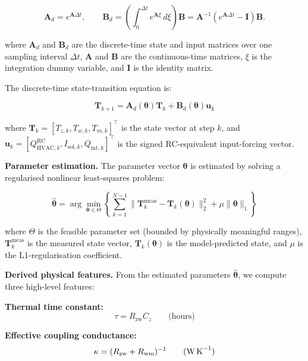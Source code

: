\documentclass[11pt]{article}
\begin{document}
\begin{equation}
\mathbf{A}_d=e^{\mathbf{A}\Delta t},
\qquad
\mathbf{B}_d=
\left(
\int_0^{\Delta t}e^{\mathbf{A}\xi}\,d\xi
\right)\mathbf{B}
=
\mathbf{A}^{-1}
\left(e^{\mathbf{A}\Delta t}-\mathbf{I}\right)\mathbf{B}.
\end{equation}

where $\mathbf{A}_d$ and $\mathbf{B}_d$ are the discrete-time state and input matrices over one sampling interval $\Delta t$, $\mathbf{A}$ and $\mathbf{B}$ are the continuous-time matrices, $\xi$ is the integration dummy variable, and $\mathbf{I}$ is the identity matrix.

The discrete-time state-transition equation is:

\begin{equation}
\mathbf{T}_{k+1} = \mathbf{A}_d(\boldsymbol{\theta}) \mathbf{T}_k + \mathbf{B}_d(\boldsymbol{\theta}) \mathbf{u}_k
\end{equation}

where $\mathbf{T}_k=[T_{z,k},T_{w,k},T_{m,k}]^\top$ is the state vector at step $k$, and $\mathbf{u}_k=[Q_{\mathrm{HVAC},k}^{\mathrm{RC}},I_{\mathrm{sol},k},Q_{\mathrm{int},k}]^\top$ is the signed RC-equivalent input-forcing vector.

\textbf{Parameter estimation.} The parameter vector $\boldsymbol{\theta}$ is estimated by solving a regularised nonlinear least-squares problem:

\begin{equation}
\hat{\boldsymbol{\theta}} = \arg\min_{\boldsymbol{\theta} \in \Theta} \left\{ \sum_{k=1}^{N-1} \| \mathbf{T}_k^{\text{meas}} - \mathbf{T}_k(\boldsymbol{\theta}) \|_2^2 + \mu \|\boldsymbol{\theta}\|_1 \right\}
\end{equation}

where $\Theta$ is the feasible parameter set (bounded by physically meaningful ranges), $\mathbf{T}_k^{\text{meas}}$ is the measured state vector, $\mathbf{T}_k(\boldsymbol{\theta})$ is the model-predicted state, and $\mu$ is the L1-regularisation coefficient.

\textbf{Derived physical features.} From the estimated parameters $\hat{\boldsymbol{\theta}}$, we compute three high-level features:

\textbf{Thermal time constant:}
\begin{equation}
\tau=R_{\mathrm{zw}}C_z \qquad \text{(hours)}
\end{equation}

\textbf{Effective coupling conductance:}
\begin{equation}
\kappa=(R_{\mathrm{zw}}+R_{\mathrm{wm}})^{-1}
\qquad \text{(W\,K}^{-1}\text{)}
\end{equation}
\end{document}
